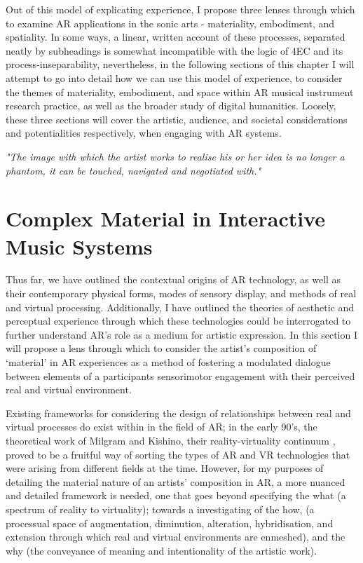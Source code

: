 Out of this model of explicating experience, I propose three lenses through which to examine AR applications in the sonic arts - materiality, embodiment, and spatiality. In some ways, a linear, written account of these processes, separated neatly by subheadings is somewhat incompatible with the logic of 4EC and its process-inseparability, nevertheless, in the following sections of this chapter I will attempt to go into detail how we can use this model of experience, to consider the themes of materiality, embodiment, and space within AR musical instrument research practice, as well as the broader study of digital humanities. Loosely, these three sections will cover the artistic, audience, and societal considerations and potentialities respectively, when engaging with AR systems.



\epigraph{\textit{"The image with which the artist works to realise his or her idea is no longer a phantom, it can be touched, navigated and negotiated with."}}{\citep[p.5]{ryan1991}}
\section{Complex Material in Interactive Music Systems}\label{sec: theory-materiality}
Thus far, we have outlined the contextual origins of AR technology, as well as their contemporary physical forms, modes of sensory display, and methods of real and virtual processing. Additionally, I have outlined the theories of aesthetic and perceptual experience through which these technologies could be interrogated to further understand AR's role as a medium for artistic expression. In this section I will propose a lens through which to consider the artist's composition of `material' in AR experiences as a method of fostering a modulated dialogue between elements of a participants sensorimotor engagement with their perceived real and virtual environment. 

Existing frameworks for considering the design of relationships between real and virtual processes do exist within in the field of AR; in the early 90's, the theoretical work of Milgram and Kishino, their reality-virtuality continuum \citeyearpar[p. 10]{milgram1994}, proved to be a fruitful way of sorting the types of AR and VR technologies that were arising from different fields at the time. However, for my purposes of detailing the material nature of an artists' composition in AR, a more nuanced and detailed framework is needed, one that goes beyond specifying the what (a spectrum of reality to virtuality); towards a investigating of the how, (a processual space of augmentation, diminution, alteration, hybridisation, and extension through which real and virtual environments are enmeshed), and the why (the conveyance of meaning and intentionality of the artistic work). 

